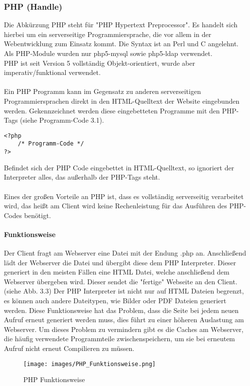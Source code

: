\subsubsection{PHP (Handle)}
Die Abkürzung PHP steht für "PHP Hypertext Preprocessor". Es handelt sich hierbei um ein serverseitige Programmiersprache, die vor allem in der Webentwicklung zum Einsatz kommt. Die Syntax ist an Perl und C angelehnt.\\
Als PHP-Module wurden nur php5-mysql sowie php5-ldap verwendet.\\
PHP ist seit Version 5 vollständig Objekt-orientiert, wurde aber imperativ/funktional verwendet.\\
\\
Ein PHP Programm kann im Gegensatz zu anderen serverseitigen Programmiersprachen direkt in den HTML-Quelltext der Website eingebunden werden. Gekennzeichnet werden diese eingebetteten Programme mit den PHP-Tags (siehe Programm-Code 3.1).\\
\begin{lstlisting}[style=customPHP, caption={PHP-Tags}]
<?php 
	/* Programm-Code */
?>
\end{lstlisting}
Befindet sich der PHP Code eingebettet in HTML-Quelltext, so ignoriert der Interpreter alles, das außerhalb der PHP-Tags steht.\\\\
Eines der großen Vorteile an PHP ist, dass es vollständig serverseitig verarbeitet wird, das heißt am Client wird keine Rechenleistung für das Ausführen des PHP-Codes benötigt.
\paragraph{Funktionsweise}
Der Client fragt am Webserver eine Datei mit der Endung .php an. Anschließend lädt der Webserver die Datei und übergibt diese dem PHP Interpreter. Dieser generiert in den meisten Fällen eine HTML Datei, welche anschließend dem Webserver übergeben wird. Dieser sendet die "fertige" Webseite an den Client. (siehe Abb. 3.3) Der PHP Interpreter ist nicht nur auf HTML Dateien begrenzt, es können auch andere Dateitypen, wie Bilder oder PDF Dateien generiert werden. Diese Funktionsweise hat das Problem, dass die Seite bei jedem neuen Aufruf erneut generiert werden muss, dies führt zu einer höheren Auslastung am Webserver. Um dieses Problem zu vermindern gibt es die Caches am Webserver, die häufig verwendete Programmteile zwischenspeichern, um sie bei erneutem Aufruf nicht erneut Compilieren zu müssen.
\begin{figure}[H]
\centering
\texttt{[image: images/PHP\_Funktionsweise.png]}
\label{Abb 3.3}
\caption{PHP Funktionsweise}
\end{figure}
